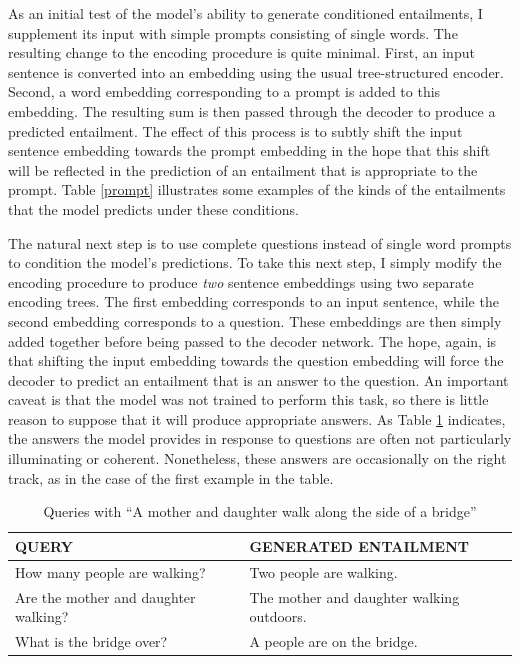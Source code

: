 As an initial test of the model's ability to generate conditioned entailments, I supplement its input with simple prompts consisting of single words. The resulting change to the encoding procedure is quite minimal. First, an input sentence is converted into an embedding using the usual tree-structured encoder. Second, a word embedding corresponding to a prompt is added to this embedding. The resulting sum is then passed through the decoder to produce a predicted entailment. The effect of this process is to subtly shift the input sentence embedding towards the prompt embedding in the hope that this shift will be reflected in the prediction of an entailment that is appropriate to the prompt. Table \ref{prompt} illustrates some examples of the kinds of the entailments that the model predicts under these conditions.  

The natural next step is to use complete questions instead of single word prompts to condition the model's predictions. To take this next step, I simply modify the encoding procedure to produce \textit{two} sentence embeddings using two separate encoding trees. The first embedding corresponds to an input sentence, while the second embedding corresponds to a question. These embeddings are then simply added together before being passed to the decoder network. The hope, again, is that shifting the input embedding towards the question embedding will force the decoder to predict an entailment that is an answer to the question. An important caveat is that the model was not trained to perform this task, so there is little reason to suppose that it will produce appropriate answers. As Table \ref{query} indicates, the answers the model provides in response to questions are often not particularly illuminating or coherent. Nonetheless, these answers are occasionally on the right track, as in the case of the first example in the table.

\begin{table}[!t]
\begin{center} 
\caption{Queries with ``A mother and daughter walk along the side of a bridge''} 
\label{query} 

\vskip 0.07in
\setlength{\tabcolsep}{8pt}
\begin{tabular}{ll} 

\hline

\rule{0pt}{3ex} QUERY &  GENERATED ENTAILMENT \\

\hline
\rule{0pt}{3ex}How many people are walking? & Two people are walking.\\
 Are the mother and daughter walking? & The mother and daughter walking outdoors.  \\
 What is the bridge over? & A people are on the bridge. \\

\hline
\end{tabular}
\end{center} 
\end{table}

